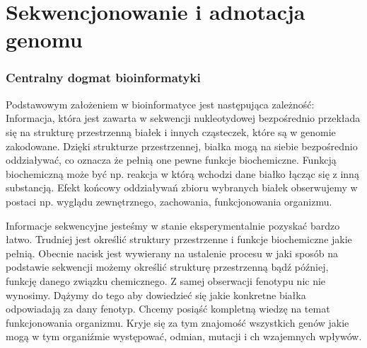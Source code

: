 \chapter{Sekwencjonowanie i adnotacja genomu}
\label{section:sekwencjonowanie_i_adnotacja}

\subsection*{Centralny dogmat bioinformatyki}
Podstawowym założeniem w bioinformatyce jest następująca zależność:
Informacja, która jest zawarta w sekwencji nukleotydowej bezpośrednio przekłada się na strukturę przestrzenną białek i innych cząsteczek, które są w genomie zakodowane. Dzięki strukturze przestrzennej, białka mogą na siebie bezpośrednio oddziaływać, co oznacza że pełnią one pewne funkcje biochemiczne. Funkcją biochemiczną może być np. reakcja w którą wchodzi dane białko łącząc się z inną substancją. Efekt końcowy oddziaływań zbioru wybranych białek obserwujemy w postaci np. wyglądu zewnętrznego, zachowania, funkcjonowania organizmu.

Informacje sekwencyjne jesteśmy w stanie eksperymentalnie pozyskać bardzo łatwo. Trudniej jest określić struktury przestrzenne i funkcje biochemiczne jakie pełnią.
Obecnie nacisk jest wywierany na ustalenie procesu w jaki sposób na podstawie sekwencji możemy określić strukturę przestrzenną bądź później, funkcję danego związku chemicznego.
Z samej obserwacji fenotypu nic nie wynosimy. Dążymy do tego aby dowiedzieć się jakie konkretne białka odpowiadają za dany fenotyp. Chcemy posiąść kompletną wiedzę na temat funkcjonowania organizmu. Kryje się za tym znajomość wszystkich genów jakie mogą w tym organiźmie występować, odmian, mutacji i ch wzajemnych wpływów.


